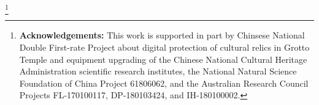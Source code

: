 \documentclass[10pt,twocolumn,letterpaper]{article}
\newcommand\blfootnote[1]{\begingroup
  \renewcommand\thefootnote{}\footnote{#1}\addtocounter{footnote}{-1}\endgroup
}
\begin{document}
\blfootnote{{\bf{Acknowledgements:}} This work is supported in part by Chinsese National Double First-rate Project about digital protection of cultural relics in Grotto Temple and equipment upgrading of the Chinese National Cultural Heritage Administration scientific research institutes, the National Natural Science Foundation of China Project 61806062, and the Australian Research Council Projects FL-170100117, DP-180103424, and IH-180100002.}

{\small


}
\end{document}
